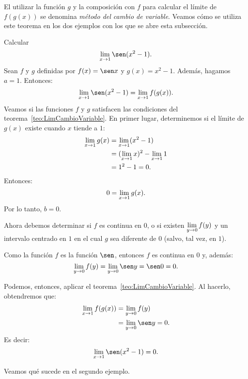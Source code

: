 El utilizar la función $g$ y la composición con $f$ para calcular el límite de $f(g(x))$ se
denomina \emph{método del cambio de variable}. Veamos cómo se utiliza este teorema en los dos
ejemplos con los que se abre esta subsección.

\begin{exemplo}[Solución]{%
Calcular
\[
\limjc{\sen(x^2 - 1)}{x}{1}.
\]
}%
Sean $f$ y $g$ definidas por $f(x) = \sen x$ y $g(x) = x^2 - 1$. Además, hagamos $a = 1$. Entonces:
\[
\limjc{\sen(x^2 - 1)}{x}{1} = \limjc{f(g(x))}{x}{1}.
\]
Veamos si las funciones $f$ y $g$ satisfacen las condiciones del
teorema~\ref{teo:LimCambioVariable}. En primer lugar, determinemos si el límite de $g(x)$ existe
cuando $x$ tiende a $1$:
\begin{align*}
\limjc{g(x)}{x}{1} &= \limjc{(x^2 - 1)}{x}{1} \\
  &= (\limjc{x}{x}{1})^2 - \limjc{1}{x}{1} \\
  &= 1^2 - 1 = 0.
\end{align*}
Entonces:
\[
0 = \limjc{g(x)}{x}{1}.
\]
Por lo tanto, $b = 0$.

Ahora debemos determinar si $f$ es continua en $0$, o si existen $\displaystyle\limjc{f(y)}{y}{0}$ y un
intervalo centrado en $1$ en el cual $g$ sea diferente de $0$ (salvo, tal vez, en $1$).

Como la función $f$ es la función $\sen$, entonces $f$ es continua en $0$ y, además:
\[
\limjc{f(y)}{y}{0} = \limjc{\sen y}{y}{0} = \sen 0 = 0.
\]

Podemos, entonces, aplicar el teorema~\ref{teo:LimCambioVariable}. Al hacerlo, obtendremos que:
\begin{align*}
\limjc{f(g(x))}{x}{1} &= \limjc{f(y)}{y}{0} \\
  &= \limjc{\sen y}{y}{0} = 0.
\end{align*}
Es decir:
\[
\limjc{\sen(x^2 - 1)}{x}{1} = 0.
\]
\end{exemplo}

Veamos qué sucede en el segundo ejemplo.

